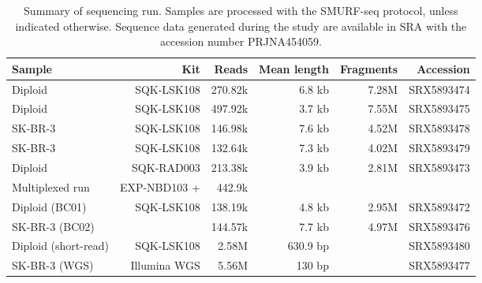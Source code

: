 \begin{table}[H]
  \centering
  \begin{tabular*}{\columnwidth}{@{\extracolsep{\fill}}lrrrrr}
    \hline
    Sample & Kit & Reads & Mean length & Fragments & Accession \\
    \hline
    Diploid & SQK-LSK108 & 270.82k & 6.8 kb & 7.28M & SRX5893474 \\
    Diploid & SQK-LSK108 & 497.92k & 3.7 kb & 7.55M & SRX5893475 \\
    SK-BR-3 & SQK-LSK108 & 146.98k & 7.6 kb & 4.52M & SRX5893478 \\
    SK-BR-3 & SQK-LSK108 & 132.64k & 7.3 kb & 4.02M & SRX5893479 \\
    \hline
    Diploid & SQK-RAD003 & 213.38k & 3.9 kb & 2.81M & SRX5893473 \\
    \hline
    Multiplexed run & EXP-NBD103 + & 442.9k & & &  \\
    Diploid (BC01) & SQK-LSK108 & 138.19k & 4.8 kb & 2.95M & SRX5893472 \\
    SK-BR-3 (BC02) &  & 144.57k & 7.7 kb & 4.97M & SRX5893476 \\
    \hline
    \hline
    Diploid (short-read) & SQK-LSK108 & 2.58M & 630.9 bp & & SRX5893480 \\
    \hline
    \hline
    SK-BR-3 (WGS) & Illumina WGS & 5.56M & 130 bp & &  SRX5893477 \\
    \hline
  \end{tabular*}
  \caption{Summary of sequencing run. Samples are processed with the
    SMURF-seq protocol, unless indicated otherwise. Sequence data
    generated during the study are available in SRA with the accession
    number PRJNA454059.}
  \label{seq-summary}
\end{table}
